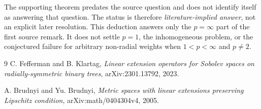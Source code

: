 \documentclass[11pt]{article}
\begin{document}
The supporting theorem predates the source question and does not identify
itself as answering that question.  The status is therefore
\emph{literature-implied answer}, not an explicit later resolution.
This deduction answers only the $p=\infty$ part of the first source remark.
It does not settle $p=1$, the inhomogeneous problem, or the conjectured
failure for arbitrary non-radial weights when $1<p<\infty$ and $p\ne2$.

\begin{thebibliography}{9}
C. Fefferman and B. Klartag,
\emph{Linear extension operators for Sobolev spaces on radially-symmetric
binary trees}, arXiv:2301.13792, 2023.

A. Brudnyi and Yu. Brudnyi,
\emph{Metric spaces with linear extensions preserving Lipschitz condition},
arXiv:math/0404304v4, 2005.
\end{thebibliography}
\end{document}
